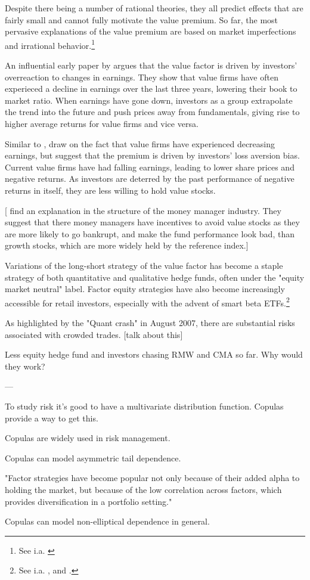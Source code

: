 Despite there being a number of rational theories, they all predict effects that are fairly small and cannot fully motivate the value premium. So far, the most pervasive explanations of the value premium are based on market imperfections and irrational behavior.\footnote{See i.a. \textcite{Ilmanen2011}}

An influential early paper by \textcite{LakonishokShleiferVishny1994} argues that the value factor is driven by investors' overreaction to changes in earnings. They show that value firms have often experieced a decline in earnings over the last three years, lowering their book to market ratio. When earnings have gone down, investors as a group extrapolate the trend into the future and push prices away from fundamentals, giving rise to higher average returns for value firms and vice versa.

Similar to \textcite{LakonishokShleiferVishny1994}, \textcite{BarberisHuang2001} draw on the fact that value firms have experienced decreasing earnings, but suggest that the premium is driven by investors' loss aversion bias. Current value firms have had falling earnings, leading to lower share prices and negative returns. As investors are deterred by the past performance of negative returns in itself, they are less willing to hold value stocks.

[\textcite{LakonishokShleiferVishny1992} find an explanation in the structure of the money manager industry. They suggest that there money managers have incentives to avoid value stocks as they are more likely to go bankrupt, and make the fund performance look bad, than growth stocks, which are more widely held by the reference index.]

Variations of the long-short strategy of the value factor has become a staple strategy of both quantitative and qualitative hedge funds, often under the "equity market neutral" label. Factor equity strategies have also become increasingly accessible for retail investors, especially with the advent of smart beta ETFs.\footnote{See i.a. \textcite{Pedersen2015}, \textcite{AQREMN} and \textcite{McKEMN}.} 

As highlighted by the "Quant crash" in August 2007, there are substantial risks associated with crowded trades. [talk about this]

Less equity hedge fund and investors chasing RMW and CMA so far. Why would they work?

---

To study risk it's good to have a multivariate distribution function. Copulas provide a way to get this.

Copulas are widely used in risk management.

Copulas can model asymmetric tail dependence.

"Factor strategies have become popular not only because of their added alpha to holding the
market, but because of the low correlation across factors, which provides diversification in
a portfolio setting."

Copulas can model non-elliptical dependence in general.
